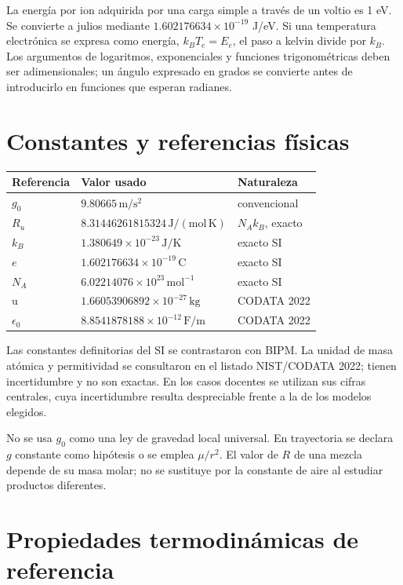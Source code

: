 La energía por ion adquirida por una carga simple a través de un voltio es 1 eV. Se convierte a julios mediante $1.602176634\times10^{-19}$ J/eV. Si una temperatura electrónica se expresa como energía, $k_BT_e=E_e$, el paso a kelvin divide por $k_B$. Los argumentos de logaritmos, exponenciales y funciones trigonométricas deben ser adimensionales; un ángulo expresado en grados se convierte antes de introducirlo en funciones que esperan radianes.
\chapter{Constantes y referencias físicas}\label{app:constants}
\begin{center}\begin{tabular}{lll}\toprule
Referencia & Valor usado & Naturaleza\\\midrule
$g_0$ & $9.80665\,\mathrm{m/s^2}$ & convencional\\
$R_u$ & $8.31446261815324\,\mathrm{J/(mol\,K)}$ & $N_Ak_B$, exacto\\
$k_B$ & $1.380649\times10^{-23}\,\mathrm{J/K}$ & exacto SI\\
$e$ & $1.602176634\times10^{-19}\,\mathrm C$ & exacto SI\\
$N_A$ & $6.02214076\times10^{23}\,\mathrm{mol^{-1}}$ & exacto SI\\
$\mathrm u$ & $1.66053906892\times10^{-27}\,\mathrm{kg}$ & CODATA 2022\\
$\epsilon_0$ & $8.8541878188\times10^{-12}\,\mathrm{F/m}$ & CODATA 2022\\
\bottomrule\end{tabular}\end{center}
Las constantes definitorias del SI se contrastaron con BIPM. La unidad de masa atómica y permitividad se consultaron en el listado NIST/CODATA 2022; tienen incertidumbre y no son exactas. En los casos docentes se utilizan sus cifras centrales, cuya incertidumbre resulta despreciable frente a la de los modelos elegidos.\cite{BIPM-SI,NIST-U}

No se usa $g_0$ como una ley de gravedad local universal. En trayectoria se declara $g$ constante como hipótesis o se emplea $\mu/r^2$. El valor de $R$ de una mezcla depende de su masa molar; no se sustituye por la constante de aire al estudiar productos diferentes.
\chapter{Propiedades termodinámicas de referencia}\label{app:properties}
